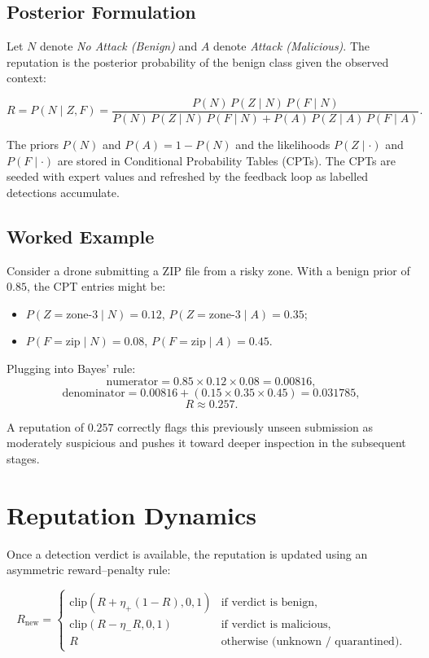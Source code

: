 \documentclass[12pt, a4paper]{report}
\begin{document}
\subsection{Posterior Formulation}

Let $N$ denote \emph{No Attack (Benign)} and $A$ denote \emph{Attack
(Malicious)}. The reputation is the posterior probability of the benign
class given the observed context:

\[
R = P(N \mid Z, F) = \frac{P(N) \, P(Z \mid N) \, P(F \mid N)}
{P(N) \, P(Z \mid N) \, P(F \mid N) + P(A) \, P(Z \mid A) \, P(F \mid A)}.
\]

The priors $P(N)$ and $P(A) = 1 - P(N)$ and the likelihoods
$P(Z \mid \cdot)$ and $P(F \mid \cdot)$ are stored in Conditional
Probability Tables (CPTs). The CPTs are seeded with expert values and
refreshed by the feedback loop as labelled detections accumulate.

\subsection{Worked Example}

Consider a drone submitting a ZIP file from a risky zone. With a benign
prior of $0.85$, the CPT entries might be:
\begin{itemize}
    \item $P(Z = \text{zone-3} \mid N) = 0.12$, $P(Z = \text{zone-3} \mid A) = 0.35$;
    \item $P(F = \text{zip} \mid N) = 0.08$, $P(F = \text{zip} \mid A) = 0.45$.
\end{itemize}

Plugging into Bayes' rule:
\[
\text{numerator} = 0.85 \times 0.12 \times 0.08 = 0.00816,
\]
\[
\text{denominator} = 0.00816 + (0.15 \times 0.35 \times 0.45) = 0.031785,
\]
\[
R \approx 0.257.
\]

A reputation of $0.257$ correctly flags this previously unseen submission
as moderately suspicious and pushes it toward deeper inspection in the
subsequent stages.

\section{Reputation Dynamics}

Once a detection verdict is available, the reputation is updated using
an asymmetric reward--penalty rule:

\[
R_{\text{new}} =
\begin{cases}
\text{clip}(R + \eta_+ (1 - R), 0, 1) & \text{if verdict is benign}, \\
\text{clip}(R - \eta_- R, 0, 1) & \text{if verdict is malicious}, \\
R & \text{otherwise (unknown / quarantined)}.
\end{cases}
\]
\end{document}
